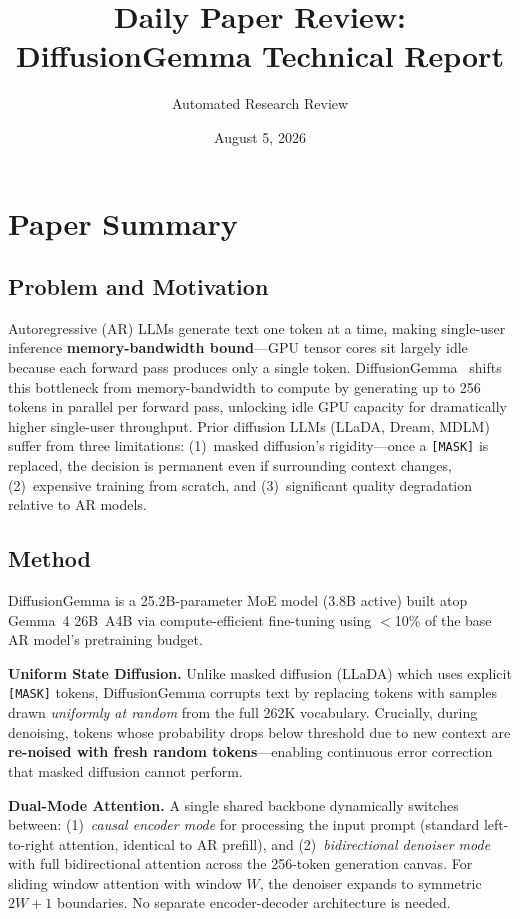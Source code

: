 \documentclass[11pt,a4paper]{article}
\title{Daily Paper Review: DiffusionGemma Technical Report}
\author{Automated Research Review}
\date{August 5, 2026}
\begin{document}
\maketitle

\section{Paper Summary}

\subsection{Problem and Motivation}
Autoregressive (AR) LLMs generate text one token at a time, making single-user inference \textbf{memory-bandwidth bound}---GPU tensor cores sit largely idle because each forward pass produces only a single token. DiffusionGemma~\cite{diffusiongemma2026} shifts this bottleneck from memory-bandwidth to compute by generating up to 256 tokens in parallel per forward pass, unlocking idle GPU capacity for dramatically higher single-user throughput. Prior diffusion LLMs (LLaDA, Dream, MDLM) suffer from three limitations: (1)~masked diffusion's rigidity---once a \texttt{[MASK]} is replaced, the decision is permanent even if surrounding context changes, (2)~expensive training from scratch, and (3)~significant quality degradation relative to AR models.

\subsection{Method}
DiffusionGemma is a 25.2B-parameter MoE model (3.8B active) built atop Gemma~4 26B~A4B via compute-efficient fine-tuning using $<$10\% of the base AR model's pretraining budget.

\textbf{Uniform State Diffusion.} Unlike masked diffusion (LLaDA) which uses explicit \texttt{[MASK]} tokens, DiffusionGemma corrupts text by replacing tokens with samples drawn \emph{uniformly at random} from the full 262K vocabulary. Crucially, during denoising, tokens whose probability drops below threshold due to new context are \textbf{re-noised with fresh random tokens}---enabling continuous error correction that masked diffusion cannot perform.

\textbf{Dual-Mode Attention.} A single shared backbone dynamically switches between: (1)~\emph{causal encoder mode} for processing the input prompt (standard left-to-right attention, identical to AR prefill), and (2)~\emph{bidirectional denoiser mode} with full bidirectional attention across the 256-token generation canvas. For sliding window attention with window $W$, the denoiser expands to symmetric $2W+1$ boundaries. No separate encoder-decoder architecture is needed.
\end{document}
